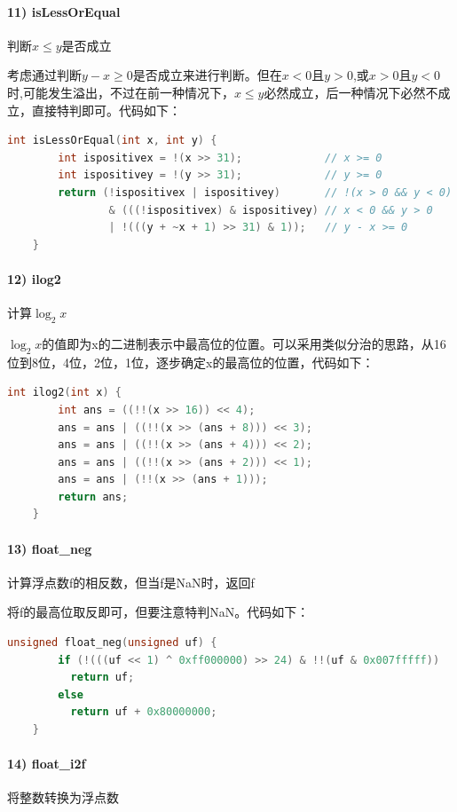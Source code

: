 \documentclass{article}
\begin{document}
    \paragraph{11) isLessOrEqual} 判断$x \le y$是否成立

    考虑通过判断$y-x\ge 0$是否成立来进行判断。但在$x<0$且$y>0$,或$x>0$且$y<0$时,可能发生溢出，不过在前一种情况下，$x \le y$必然成立，后一种情况下必然不成立，直接特判即可。代码如下：
    \begin{lstlisting}[language=C]
    int isLessOrEqual(int x, int y) {
        int ispositivex = !(x >> 31);             // x >= 0
        int ispositivey = !(y >> 31);             // y >= 0
        return (!ispositivex | ispositivey)       // !(x > 0 && y < 0)
                & (((!ispositivex) & ispositivey) // x < 0 && y > 0
                | !(((y + ~x + 1) >> 31) & 1));   // y - x >= 0
    }
\end{lstlisting}
    \paragraph{12) ilog2} 计算$\log_2 x$

    $\log_2 x$的值即为x的二进制表示中最高位的位置。可以采用类似分治的思路，从16位到8位，4位，2位，1位，逐步确定x的最高位的位置，代码如下：
\begin{lstlisting}[language=C]
    int ilog2(int x) {
        int ans = ((!!(x >> 16)) << 4);
        ans = ans | ((!!(x >> (ans + 8))) << 3);
        ans = ans | ((!!(x >> (ans + 4))) << 2);
        ans = ans | ((!!(x >> (ans + 2))) << 1);
        ans = ans | (!!(x >> (ans + 1)));
        return ans;
    }
\end{lstlisting}  
\paragraph{13) float\_neg} 计算浮点数f的相反数，但当f是NaN时，返回f

将f的最高位取反即可，但要注意特判NaN。代码如下：
\begin{lstlisting}[language=C]
    unsigned float_neg(unsigned uf) {
        if (!(((uf << 1) ^ 0xff000000) >> 24) & !!(uf & 0x007fffff))
          return uf;
        else
          return uf + 0x80000000;
    }
\end{lstlisting}  

\paragraph{14) float\_i2f} 将整数转换为浮点数
\end{document}
